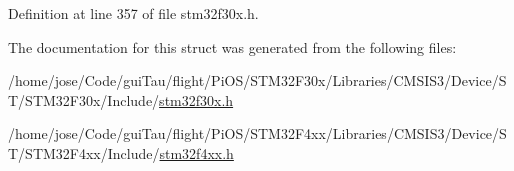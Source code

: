 Definition at line 357 of file stm32f30x.\-h.



The documentation for this struct was generated from the following files\-:\begin{DoxyCompactItemize}
\item 
/home/jose/\-Code/gui\-Tau/flight/\-Pi\-O\-S/\-S\-T\-M32\-F30x/\-Libraries/\-C\-M\-S\-I\-S3/\-Device/\-S\-T/\-S\-T\-M32\-F30x/\-Include/\hyperlink{stm32f30x_8h}{stm32f30x.\-h}\item 
/home/jose/\-Code/gui\-Tau/flight/\-Pi\-O\-S/\-S\-T\-M32\-F4xx/\-Libraries/\-C\-M\-S\-I\-S3/\-Device/\-S\-T/\-S\-T\-M32\-F4xx/\-Include/\hyperlink{stm32f4xx_8h}{stm32f4xx.\-h}\end{DoxyCompactItemize}
